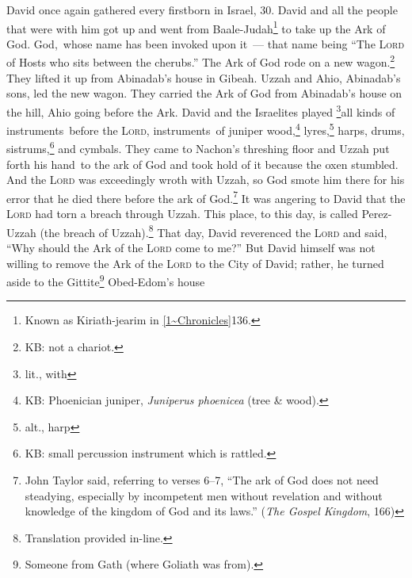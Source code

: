 
\begin{inparaenum}
     David once again gathered every firstborn in Israel, 30.%
     David and all the people that were with him got up and went from Baale-Judah\footnote{Known as Kiriath-jearim in \vref{1~Chronicles}{13}{6}.} to take up the Ark of God. God,\understood\ whose name has been invoked upon it~--- that name being ``The \textsc{Lord} of Hosts who sits between the cherubs.''%
     The Ark of God rode on a new wagon.\footnote{KB: not a chariot.} They lifted it up from Abinadab's house in Gibeah. Uzzah and Ahio, Abinadab's sons, led the new wagon.%
     They carried the Ark of God from Abinadab's house on the hill, Ahio going before the Ark.%
     David and the Israelites played \footnote{lit., with}all kinds of instruments\understood\ before the \textsc{Lord}, instruments\understood\ of juniper wood,\footnote{KB: Phoenician juniper, \textit{Juniperus phoenicea} (tree \& wood).} lyres,\footnote{alt., harp} harps, drums, sistrums,\footnote{KB: small percussion instrument which is rattled.} and cymbals.%
     They came to Nachon's threshing floor and Uzzah put forth his hand\understood\ to the ark of God and took hold of it because the oxen stumbled.%
     And the \textsc{Lord} was exceedingly wroth with Uzzah, so God smote him there for his error that he died there before the ark of God.\footnote{John Taylor said, referring to verses 6--7, ``The ark of God does not need steadying, especially by incompetent men without revelation and without knowledge of the kingdom of God and its laws.'' (\textit{The Gospel Kingdom}, 166)}%
     It was angering to David that the \textsc{Lord} had torn a breach through Uzzah. This place, to this day, is called Perez-Uzzah (the breach of Uzzah).\footnote{Translation provided in-line.}%
     That day, David reverenced the \textsc{Lord} and said, ``Why should the Ark of the \textsc{Lord} come to me?''%
     But David himself was not willing to remove the Ark of the \textsc{Lord} to the City of David; rather, he turned aside to the Gittite\footnote{Someone from Gath (where Goliath was from).} Obed-Edom's house%

\end{inparaenum}
